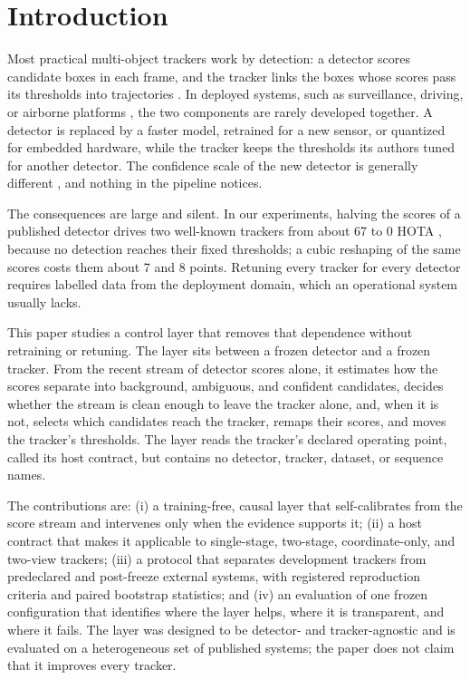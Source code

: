 \documentclass[pdflatex,sn-mathphys-num,iicol]{sn-jnl}
\begin{document}
\maketitle

\section{Introduction}\label{sec:intro}
Most practical multi-object trackers work by detection: a detector scores candidate boxes in each frame, and the tracker links the boxes whose scores pass its thresholds into trajectories \cite{bewley2016sort,zhang2022bytetrack,cao2023ocsort}. In deployed systems, such as surveillance, driving, or airborne platforms \cite{miller2015multitarget,lu2024uavdetection}, the two components are rarely developed together. A detector is replaced by a faster model, retrained for a new sensor, or quantized for embedded hardware, while the tracker keeps the thresholds its authors tuned for another detector. The confidence scale of the new detector is generally different \cite{kuppers2020detcalib}, and nothing in the pipeline notices.

The consequences are large and silent. In our experiments, halving the scores of a published detector drives two well-known trackers from about 67 to 0 HOTA \cite{luiten2021hota}, because no detection reaches their fixed thresholds; a cubic reshaping of the same scores costs them about 7 and 8 points. Retuning every tracker for every detector requires labelled data from the deployment domain, which an operational system usually lacks.

This paper studies a control layer that removes that dependence without retraining or retuning. The layer sits between a frozen detector and a frozen tracker. From the recent stream of detector scores alone, it estimates how the scores separate into background, ambiguous, and confident candidates, decides whether the stream is clean enough to leave the tracker alone, and, when it is not, selects which candidates reach the tracker, remaps their scores, and moves the tracker's thresholds. The layer reads the tracker's declared operating point, called its host contract, but contains no detector, tracker, dataset, or sequence names.

The contributions are: (i) a training-free, causal layer that self-calibrates from the score stream and intervenes only when the evidence supports it; (ii) a host contract that makes it applicable to single-stage, two-stage, coordinate-only, and two-view trackers; (iii) a protocol that separates development trackers from predeclared and post-freeze external systems, with registered reproduction criteria and paired bootstrap statistics; and (iv) an evaluation of one frozen configuration that identifies where the layer helps, where it is transparent, and where it fails. The layer was designed to be detector- and tracker-agnostic and is evaluated on a heterogeneous set of published systems; the paper does not claim that it improves every tracker.
\end{document}

